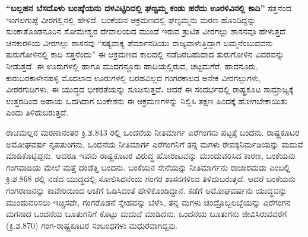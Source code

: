 \textbf{ “ಬಲ್ಲಹನ ಬೆಸದೊಳು ಬಂಙ್ಕೆಯನು ದಳವಿಟ್ಟಿರಿದಲ್ಲಿ ಘಣ್ಟಮ್ಮ ಕಂಡು ಹರೆದು ಊರಳಿವಿನಲ್ಲಿ ಕಾದಿ”} ಸತ್ತನೆಂದ ಇಂಗಲಗುಪ್ಪೆ ವೀರಗಲ್ಲಿನಲ್ಲಿ ಹೇಳಿದೆ. ಬಂಕೆಯನ ಆಕ್ರಮಣದಲ್ಲಿ ಘಣ್ಟಮ್ಮನು ಮರಣ ಹೊಂದಿದ್ದನ್ನು ಸುಂಕಾತೊಂಡನೂರಿನ ಸೋಮೇಶ್ವರ ದೇವಾಲಯದ ಮುಂದೆ ಇರುವ ತ್ರುಟಿತ ವೀರಗಲ್ಲು ಶಾಸನವೂ ಹೇಳುತ್ತದೆ. ಚಿನಕುರಳಿಯ ವೀರಗಲ್ಲು ಶಾಸನವು “ಸತ್ಯವಾಕ್ಯ ಪೆರ್ಮಾನಡಿಯು ರಾಜ್ಯವಾಳುತ್ತಿದ್ದಾಗ ಬಮ್ಮನೆಂಬುವವನು ತುರುಗೋಳಿನಲ್ಲಿ ಕಾದಿ ಸತ್ತನೆಂದು” ಈ ಆಕ್ರಮಣದ ಕಾಲದಲ್ಲಿ ನಡೆದಿರಬಹುದಾದ ತುರುಗೋಳಿನ ವಿವರವನ್ನು ನೀಡುತ್ತದೆ. ಈ ಊರುಗಳಲ್ಲಿ ಹಾಗೂ ಮುದಗನ್ದೂರು ಹಾದಿಯಲ್ಲಿರುವ, ಚಟ್ಟಮಗೆರೆ, ಹಾದನೂರು, ಕುರುಬರಕಾಳೇನಹಳ್ಳಿ ಮೊದಲಾದ ಊರುಗಳಲ್ಲಿ ಬರಹವಿಲ್ಲದ ಗಂಗರಕಾಲದ ಅನೇಕ ವೀರಗಲ್ಲುಗಳು, ವೀರರಗುಡಿಗಳು, ಈ ಯುದ್ಧದ ಭೀಕರತೆಯನ್ನು ಸೂಚಿಸುತ್ತವೆ\textbf{.} ಆದರೆ ಈ ಸಂದರ್ಭದಲ್ಲಿ ರಾಷ್ಟ್ರಕೂಟ ಸಾಮ್ರಾಜ್ಯಕ್ಕೆ ಉತ್ತರದಿಂದ ಅಪಾಯ ಒದಗಿದಾಗ ಬಂಕೇಶನು ಈ ಆಕ್ರಮಣಗಳನ್ನು ನಿಲ್ಲಿಸಿ ತಕ್ಷಣ ಹಿಂದಕ್ಕೆ ಹೋಗಬೇಕಾಯಿತು ಎಂದು ತಿಳಿದುಬರುತ್ತದೆ.

ರಾಚಮಲ್ಲನ ಮರಣಾನಂತರ ಕ್ರಿ.ಶ.843 ರಲ್ಲಿ ಒಂದನೆಯ ನೀತಿಮಾರ್ಗ ಎರೆಗಂಗನು ಪಟ್ಟಕ್ಕೆ ಬಂದನು. ರಾಷ್ಟ್ರಕೂಟರ ಅಮೋಘವರ್ಷ ನೃಪತುಂಗನು, ಒಂದನೆಯ ನೀತಿಮಾರ್ಗ ಎರೆಗಂಗನಿಗೆ ತನ್ನ ಮಗಳು ರೇವಕ್ಕನಿರ್ಮಡಿಯನ್ನು ಮದುವೆ ಮಾಡಿಕೊಟ್ಟಿದ್ದನು. ಆದರೂ ಇವನು ರಾಷ್ಟ್ರಕೂಟರ ವಿರುದ್ಧ ಹೋರಾಟವನ್ನು ಮುಂದುವರಿಸಿದ ಕಾರಣ, ಬಂಕೆಯನು ಗಂಗವಾಡಿಯ ಮೇಲೆ ಮತ್ತೆ ದಂಡೆತ್ತಿ ಬಂದನು. ಬಂಕೆಯನ ಸೇನೆಯನ್ನು ನೀತಿಮಾರ್ಗನು ರಾಜಾರಮಡು ಎಂಬಲ್ಲಿ ಕ್ರಿ.ಶ.868 ರಲ್ಲಿ ನಡೆದ ಯುದ್ಧದಲ್ಲಿ ಸೋಲಿಸಿದನೆಂದು ಗಂಗರ ಶಾಸನಗಳಿಂದ ತಿಳಿದುಬರುತ್ತದೆ. ಆದರೆ ಬಂಕೆಯನು ಗಂಗರಾಜನನ್ನು ಕಾವೇರಿಯಿಂದ ಆಚೆಗೆ ಓಡಿಸಿದಂತೆ ಹೇಳಿಕೊಂಡಿದ್ದಾನೆ. ಕಡೆಗೆ ಅಮೋಘವರ್ಷನು ಯುದ್ಧವನ್ನು ಮುಂದುವರಿಸಲು ಇಚ್ಚಿಸದೇ, ಗಂಗರೊಡನೆ ಸ್ನೇಹವನ್ನು ಬೆಳೆಸಿ, ತನ್ನ ಮಗಳು ಚಂದ್ರೊಬ್ಬಲಬ್ಬೆಯನ್ನು ಎರೆಗಂಗನ ಮಗನಾದ ಒಂದನೆಯ ಬೂತುಗನಿಗೆ ಕೊಟ್ಟು ಮದುವೆ ಮಾಡಿದನು. ಒಂದನೆಯ ಬೂತುಗನು ಜೀವಿಸಿರುವವರೆಗೆ (ಕ್ರಿ.ಶ.870) ಗಂಗ-ರಾಷ್ಟ್ರಕೂಟರ ಸಂಬಂಧಗಳು ಮಧುರವಾಗಿದ್ದವು.

